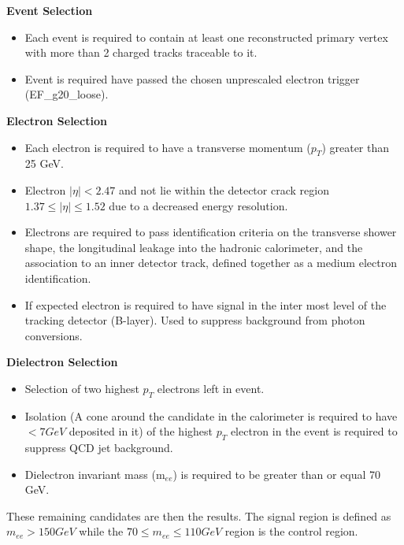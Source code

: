 	{\bf Event Selection}
	\begin{itemize}
	\item Each event is required to contain at least one reconstructed primary vertex with more than 2 charged tracks traceable to it.
	\item Event is required have passed the chosen unprescaled electron trigger (EF\_g20\_loose).
	\end{itemize}

	{\bf Electron Selection}
	\begin{itemize}
	\item Each electron is required to have a transverse momentum ($p_{T}$) greater than 25 GeV.
	\item Electron $|\eta| < 2.47$ and not lie within the detector crack region $1.37 \leq |\eta| \leq 1.52$ due to a decreased energy resolution.
	\item Electrons are required to pass identification criteria on the transverse shower shape, the longitudinal leakage into the hadronic calorimeter, and the association to an inner detector track, defined together as a medium electron identification.
	\item If expected electron is required to have signal in the inter most level of the tracking detector (B-layer). Used to suppress background from photon conversions.
	\end{itemize}

	{\bf Dielectron Selection}
	\begin{itemize}
	\item Selection of two highest $p_{T}$ electrons left in event.
	\item Isolation (A cone around the candidate in the calorimeter is required to have $< 7 GeV$ deposited in it) of the highest $p_{T}$ electron in the event is required to suppress QCD jet background. 
	\item Dielectron invariant mass (m$_{ee}$) is required to be greater than or equal 70 GeV.
	\end{itemize}

	These remaining candidates are then the results. The signal region is defined as $m_{ee} > 150 GeV$ while the $70 \leq m_{ee} \leq 110 GeV$ region is the control region.

